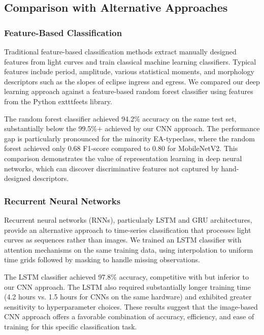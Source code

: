 \documentclass[11pt,a4paper]{article}
\newcommand{\EA}{EA-type}
\begin{document}
\subsection{Comparison with Alternative Approaches}

\subsubsection{Feature-Based Classification}

Traditional feature-based classification methods extract manually designed features from light curves and train classical machine learning classifiers. Typical features include period, amplitude, various statistical moments, and morphology descriptors such as the slopes of eclipse ingress and egress. We compared our deep learning approach against a feature-based random forest classifier using features from the Python 	exttt{feets} library.

The random forest classifier achieved 94.2\% accuracy on the same test set, substantially below the 99.5\%+ achieved by our CNN approach. The performance gap is particularly pronounced for the minority \EA class, where the random forest achieved only 0.68 F1-score compared to 0.80 for MobileNetV2. This comparison demonstrates the value of representation learning in deep neural networks, which can discover discriminative features not captured by hand-designed descriptors.

\subsubsection{Recurrent Neural Networks}

Recurrent neural networks (RNNs), particularly LSTM and GRU architectures, provide an alternative approach to time-series classification that processes light curves as sequences rather than images. We trained an LSTM classifier with attention mechanisms on the same training data, using interpolation to uniform time grids followed by masking to handle missing observations.

The LSTM classifier achieved 97.8\% accuracy, competitive with but inferior to our CNN approach. The LSTM also required substantially longer training time (4.2 hours vs. 1.5 hours for CNNs on the same hardware) and exhibited greater sensitivity to hyperparameter choices. These results suggest that the image-based CNN approach offers a favorable combination of accuracy, efficiency, and ease of training for this specific classification task.
\end{document}
